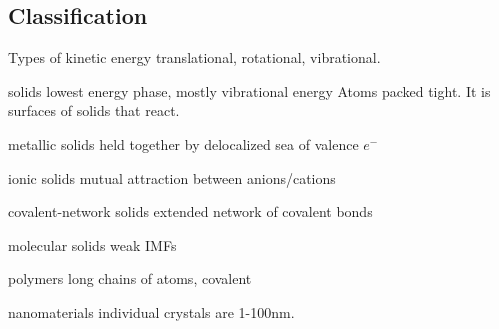 \begin{mdframed}
    \subsection{Classification}
    \begin{multicols}{3}
\begin{compactdesc}
    \item[Types of kinetic energy] translational, rotational, vibrational.
        \item[solids] lowest energy phase, mostly vibrational energy
        Atoms packed tight. It is surfaces of solids that react.
        \item[metallic solids] held together by delocalized sea of valence $e^-$
        \item[ionic solids] mutual attraction between anions/cations
        \item[covalent-network solids] extended network of covalent bonds
        \item[molecular solids] weak IMFs
        \item[polymers] long chains of atoms, covalent
        \item[nanomaterials] individual crystals are 1-100nm.
    \end{compactdesc}
\end{multicols}
\end{mdframed}


